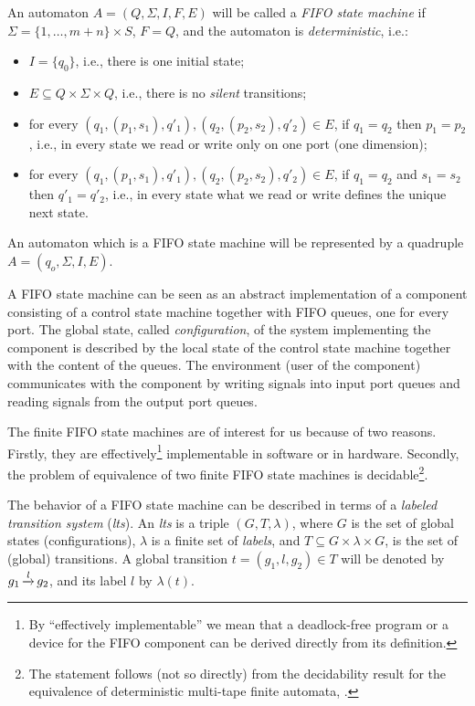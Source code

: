 \documentclass{llncs}
\newcommand{\udarrow}{{\uparrow\downarrow}}
\newcommand{\out}[1]{}
\newcommand{\df}[1]{\ \stackrel{\mathtt{def}}{#1}\ }
\newcommand{\fleche}[1]{\displaystyle \mathop {\mbox{\rightarrowfill}}^{#1} }
\begin{document}
\out{ An example of a finite state FIFO component is the ``copy''
  component: $\mathtt{copy}(1,1)\df{=} {\udarrow}\{(u,u) \mid u \in
  S^\ast\}$, with one input and one output port.
% 
}

An automaton $A=(Q,\Sigma,I,F,E)$ will be called a \emph{FIFO state
  machine} if $\Sigma=\{1,\ldots,m+n\}\times S$, $F=Q$, and the
automaton is \emph{deterministic}, i.e.:
\begin{itemize}
\item $I=\{q_0\}$, i.e., there is one initial state;
\item $E\subseteq Q\times \Sigma\times Q$, i.e., there is no
  \emph{silent} transitions;
\item for every $(q_1,(p_1,s_1),q'_1), (q_2,(p_2,s_2),q'_2)\in E$, if
  $q_1=q_2$ then $p_1=p_2$, i.e., in every state we read or write only
  on one port (one dimension);
\item for every $(q_1,(p_1,s_1),q'_1), (q_2,(p_2,s_2),q'_2)\in E$, if
  $q_1=q_2$ and $s_1=s_2$ then $q'_1=q'_2$, i.e., in every state what we 
  read or write defines the unique next state.
\end{itemize} 

An automaton which is a FIFO state machine will be represented by a
quadruple $A=(q_o,\Sigma,I,E)$.

A FIFO state machine can be seen as an abstract implementation of a
component consisting of a control state machine together with FIFO
queues, one for every port. The global state, called
\emph{configuration}, of the system implementing the component is
described by the local state of the control state machine together
with the content of the queues. The environment (user of the
component) communicates with the component by writing signals into
input port queues and reading signals from the output port queues.

The finite FIFO state machines are of interest for us
because of two reasons. Firstly, they are effectively\footnote{By
  ``effectively implementable'' we mean that a deadlock-free program
  or a device for the FIFO component can be derived directly from its
  definition.}  implementable in software or in hardware. Secondly,
the problem of equivalence of two finite FIFO state
machines is decidable\footnote{The statement follows (not so directly)
  from the decidability result for the equivalence of deterministic
  multi-tape finite automata, \cite{hk-91}.}.


The behavior of a FIFO state machine can be described in
terms of a \emph{labeled transition system} (\emph{lts}). An
\emph{lts} is a triple $(G,T,\lambda)$, where $G$ is the set of global
states (configurations), $\lambda$ is a finite set of \emph{labels},
and $T\subseteq G\times\lambda\times G$, is the set of (global)
transitions. A global transition $t=(g_1,l,g_2)\in T$ will be denoted
by $g_1\fleche{l}g_2$, and its label $l$ by $\lambda(t)$.
\end{document}

